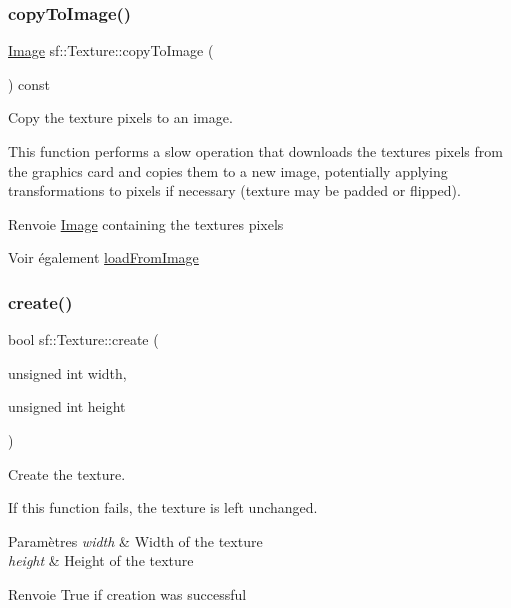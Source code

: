 \subsubsection{\texorpdfstring{copy\+To\+Image()}{copyToImage()}}
{\footnotesize\ttfamily \hyperlink{classsf_1_1Image}{Image} sf\+::\+Texture\+::copy\+To\+Image (\begin{DoxyParamCaption}{ }\end{DoxyParamCaption}) const}



Copy the texture pixels to an image. 

This function performs a slow operation that downloads the texture\textquotesingle{}s pixels from the graphics card and copies them to a new image, potentially applying transformations to pixels if necessary (texture may be padded or flipped).

\begin{DoxyReturn}{Renvoie}
\hyperlink{classsf_1_1Image}{Image} containing the texture\textquotesingle{}s pixels
\end{DoxyReturn}
\begin{DoxySeeAlso}{Voir également}
\hyperlink{classsf_1_1Texture_abec4567ad9856a3596dc74803f26fba2}{load\+From\+Image} 
\end{DoxySeeAlso}
\mbox{\label{classsf_1_1Texture_a89b4c7d204acf1033c3a1b6e0a3ad0a3}} 
\subsubsection{\texorpdfstring{create()}{create()}}
{\footnotesize\ttfamily bool sf\+::\+Texture\+::create (\begin{DoxyParamCaption}\item[{unsigned int}]{width,  }\item[{unsigned int}]{height }\end{DoxyParamCaption})}



Create the texture. 

If this function fails, the texture is left unchanged.


\begin{DoxyParams}{Paramètres}
{\em width} & Width of the texture \\
\hline
{\em height} & Height of the texture\\
\hline
\end{DoxyParams}
\begin{DoxyReturn}{Renvoie}
True if creation was successful 
\end{DoxyReturn}
\mbox{\label{classsf_1_1Texture_a0bf905d487b104b758549c2e9e20a3fb}} 
